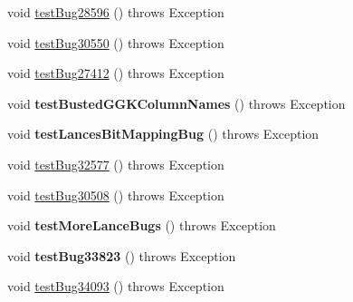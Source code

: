 \begin{DoxyCompactItemize}
\item 
void \mbox{\hyperlink{classtestsuite_1_1regression_1_1_statement_regression_test_a1d616199f65aad8a199b762687ef4880}{test\+Bug28596}} ()  throws Exception 
\item 
void \mbox{\hyperlink{classtestsuite_1_1regression_1_1_statement_regression_test_a04e7c997d4e285f4538f897d61c1110e}{test\+Bug30550}} ()  throws Exception 
\item 
void \mbox{\hyperlink{classtestsuite_1_1regression_1_1_statement_regression_test_a8fe44dff0f28bc878c51eb27e789c9b4}{test\+Bug27412}} ()  throws Exception 
\item 
\mbox{\label{classtestsuite_1_1regression_1_1_statement_regression_test_a26becb1c5466427e8a1b403274a72a73}} 
void {\bfseries test\+Busted\+G\+G\+K\+Column\+Names} ()  throws Exception 
\item 
\mbox{\label{classtestsuite_1_1regression_1_1_statement_regression_test_a2774bec021fba29b36078391bb2d3363}} 
void {\bfseries test\+Lances\+Bit\+Mapping\+Bug} ()  throws Exception 
\item 
void \mbox{\hyperlink{classtestsuite_1_1regression_1_1_statement_regression_test_a46c9677cc1878bfd4f5da911d30cac02}{test\+Bug32577}} ()  throws Exception 
\item 
void \mbox{\hyperlink{classtestsuite_1_1regression_1_1_statement_regression_test_a7cb27931fda37ceec6733fcd0e95ced5}{test\+Bug30508}} ()  throws Exception 
\item 
\mbox{\label{classtestsuite_1_1regression_1_1_statement_regression_test_afd9228e69b7dd6bbe30d716cebeac729}} 
void {\bfseries test\+More\+Lance\+Bugs} ()  throws Exception 
\item 
\mbox{\label{classtestsuite_1_1regression_1_1_statement_regression_test_a5d8cd5c61277cdedeb6ba9bb4626f26e}} 
void {\bfseries test\+Bug33823} ()  throws Exception 
\item 
void \mbox{\hyperlink{classtestsuite_1_1regression_1_1_statement_regression_test_accd5c83c1b95ec64b7d7868f9ea2be99}{test\+Bug34093}} ()  throws Exception 
\item 
\mbox{\label{classtestsuite_1_1regression_1_1_statement_regression_test_a4da5d0486fdf95888cc7b48416651a78}} 

\end{DoxyCompactItemize}
